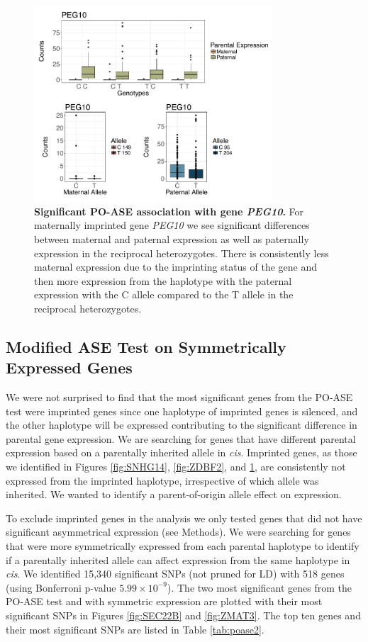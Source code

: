 \begin{figure}[!htb]
\centering \includegraphics[width=3.5in]{img/ch04/PEG10.pdf}
\caption[Significant PO-ASE association with gene \emph{PEG10}.]{\textbf{Significant PO-ASE association with gene \emph{PEG10}.} For maternally imprinted gene \emph{PEG10} we see significant differences between maternal and paternal expression as well as paternally expression in the reciprocal heterozygotes. There is consistently less maternal expression due to the imprinting status of the gene and then more expression from the haplotype with the paternal expression with the C allele compared to the T allele in the reciprocal heterozygotes.}
\label{fig:PEG10}
\end{figure}


\subsection{Modified ASE Test on Symmetrically Expressed Genes}\label{Modified ASE Test on Symmetrically Expressed Genes} 
We were not surprised to find that the most significant genes from the PO-ASE test were imprinted genes since one haplotype of imprinted genes is silenced, and the other haplotype will be expressed contributing to the significant difference in parental gene expression. We are searching for genes that have different parental expression based on a parentally inherited allele in \emph{cis}. Imprinted genes, as those we identified in Figures \ref{fig:SNHG14}, \ref{fig:ZDBF2}, and \ref{fig:PEG10}, are consistently not expressed from the imprinted haplotype, irrespective of which allele was inherited. We wanted to identify a parent-of-origin allele effect on expression.
 
To exclude imprinted genes in the analysis we only tested genes that did not have significant asymmetrical expression (see Methods). We were searching for genes that were more symmetrically expressed from each parental haplotype to identify if a parentally inherited allele can affect expression from the same haplotype in \emph{cis}. We identified 15,340 significant SNPs (not pruned for LD) with 518 genes (using Bonferroni p-value $5.99 \times 10^{-9} $). The two most significant genes from the PO-ASE test and with symmetric expression are plotted with their most significant SNPs in Figures \ref{fig:SEC22B} and \ref{fig:ZMAT3}. The top ten genes and their most significant SNPs are listed in Table \ref{tab:poase2}.


